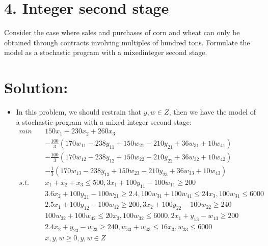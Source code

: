 \documentclass{article}
\theoremstyle{definition}
\theoremstyle{definition}
\theoremstyle{remark}
\begin{document}
\section*{4. Integer second stage}
Consider the case where sales and purchases of corn and wheat can
only be obtained through contracts involving multiples of hundred
tons. Formulate the model as a stochastic program with a mixedinteger
second stage.
\section*{Solution:}
\begin{itemize}
\item In this problem, we should restrain that $y,w\in Z$, then we have the model of a stochastic program with a mixed-integer second stage:
\begin{equation}
\begin{aligned}
min \quad &150x_1+230x_2+260x_3 \\
&-\frac{100}{3}(170w_{11}-238y_{11}+150w_{21}-210y_{21}+36w_{31}+10w_{41})\\
&-\frac{100}{3}(170w_{12}-238y_{12}+150w_{22}-210y_{22}+36w_{32}+10w_{42})\\
&-\frac{1}{3}(170w_{13}-238y_{13}+150w_{23}-210y_{23}+36w_{33}+10w_{43})\\
s.t. \quad &x_1+x_2+x_3\leq500, 3x_1+100y_{11}-100w_{11}\geq200 \\
&3.6x_2+100y_{21}-100w_{21}\geq 2.4, 100w_{31}+100w_{41}\leq24x_3,100w_{31}\leq6000 \\
&2.5x_1+100y_{12}-100w_{12}\geq200, 3x_2+100y_{22}-100w_{22}\geq240 \\               
&100w_{32}+100w_{42}\leq20x_3, 100w_{32}\leq6000,2x_1+y_{13}-w_{13}\geq200 \\   
&2.4x_2+y_{23}-w_{23}\geq240, w_{33}+w_{43}\leq16x_3,w_{33}\leq6000 \\
&x,y,w\geq0,y,w\in Z
\end{aligned}
\end{equation}
\end{itemize}
\end{document}
